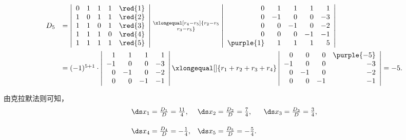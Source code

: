 \begin{frame}

$$
\begin{array}{rl}
  D_5 &= \left|
        \begin{array}{rrrrr}
          0&1&1&1&\red{1}\\
          1&0&1&1&\red{2}\\
          1&1&0&1&\red{3}\\
          1&1&1&0&\red{4}\\
          1&1&1&1&\red{5}\\
        \end{array}
  \right|  \xlongequal[r_4-r_5]{r_2-r_5\atop r_3-r_5}
  \left|
  \begin{array}{rrrrr}
    0&1&1&1&{1}\\
    0&-1&0&0&{-3}\\
    0&0&-1&0&{-2}\\
    0&0&0&-1&{-1}\\
    \purple{1}&1&1&1&{5}\\
  \end{array}
  \right| \\[0.4in]
      & =  (-1)^{5+1} \cdot    
        \left|
        \begin{array}{rrrr}
          1&1&1&{1}\\
          -1&0&0&{-3}\\
          0&-1&0&{-2}\\
          0&0&-1&{-1}\\
        \end{array}
  \right|
  \xlongequal[]{r_1+r_2+r_3+r_4}
  \left|
  \begin{array}{rrrr}
    0&0&0&\purple{-5}\\
    -1&0&0&{-3}\\
    0&-1&0&{-2}\\
    0&0&-1&{-1}\\
  \end{array}\right| = -5.
\end{array}
$$

由克拉默法则可知，
$$
\begin{array}{lll}
  \ds x_1 = \frac{D_1}D = \frac{11}4, &
                                        \ds x_2 = \frac{D_2}D = \frac74, &
                                                                           \ds x_3 = \frac{D_3}D = \frac34, \\[0.2in]
  \ds x_4 = \frac{D_4}D = -\frac14, &
                                      \ds x_5 = \frac{D_5}D = -\frac54.
\end{array}
$$


\end{frame}

